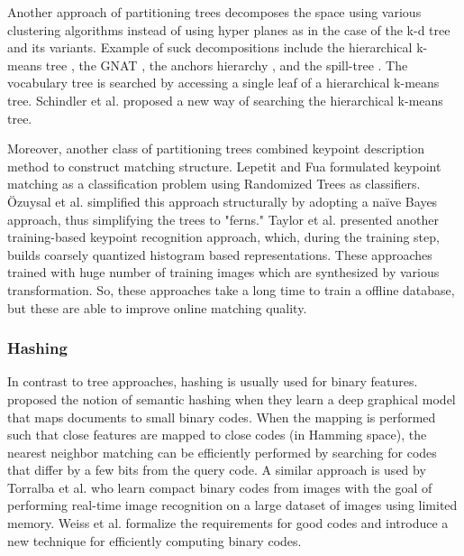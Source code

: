 Another approach of partitioning trees decomposes the space using various clustering algorithms instead of using hyper planes as in the case of the k-d tree and its variants. Example of suck decompositions include the hierarchical k-means tree \cite{fukunaga_branch_1975}, the GNAT \cite{brin_near_1995}, the anchors hierarchy \cite{moore_anchors_2000}, and the spill-tree \cite{liu_investigation_2004}. The vocabulary tree\cite{nister_scalable_2006} is searched by accessing a single leaf of a hierarchical k-means tree. Schindler et al. \cite{schindler_city-scale_2007} proposed a new way of searching the hierarchical k-means tree.

Moreover, another class of partitioning trees combined keypoint description method to construct matching structure\cite{lepetit_keypoint_2006,ozuysal_fast_2007,ozuysal_fast_2010}. Lepetit and Fua\cite{lepetit_keypoint_2006} formulated keypoint matching as a classification problem using Randomized Trees as classifiers. \"{O}zuysal et al.\cite{ozuysal_fast_2007} simplified this approach structurally by adopting a na\"{i}ve Bayes approach, thus simplifying the trees to "ferns." Taylor et al.\cite{taylor_robust_2009} presented another training-based keypoint recognition approach, which, during the training step, builds coarsely quantized histogram based representations. These approaches trained with huge number of training images which are synthesized by various transformation. So, these approaches take a long time to train a offline database, but these are able to improve online matching quality.


\subsubsection{Hashing}

In contrast to tree approaches, hashing is usually used for binary features. \cite{salakhutdinov_semantic_2009} proposed the notion of semantic hashing when they learn a deep graphical model that maps documents to small binary codes. When the mapping is performed such that close features are mapped to close codes (in Hamming space), the nearest neighbor matching can be efficiently performed by searching for codes that differ by a few bits from the query code. A similar approach is used by Torralba et al.\cite{torralba_small_2008} who learn compact binary codes from images with the goal of performing real-time image recognition on a large dataset of images using limited memory. Weiss et al.\cite{weiss_spectral_2009} formalize the requirements for good codes and introduce a new technique for efficiently computing binary codes. 

